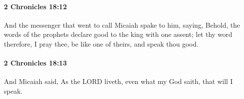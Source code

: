 		\paragraph{2 Chronicles 18:12} %
			\label{2CHRONICLES-18-12}

			And the messenger that went to call Micaiah spake to him, saying, Behold, the words of the prophets declare good to the king with one assent; let thy word therefore, I pray thee, be like one of theirs, and speak thou good.


		\paragraph{2 Chronicles 18:13} %
			\label{2CHRONICLES-18-13}

			And Micaiah said, As the LORD liveth, even what my God saith, that will I speak.


